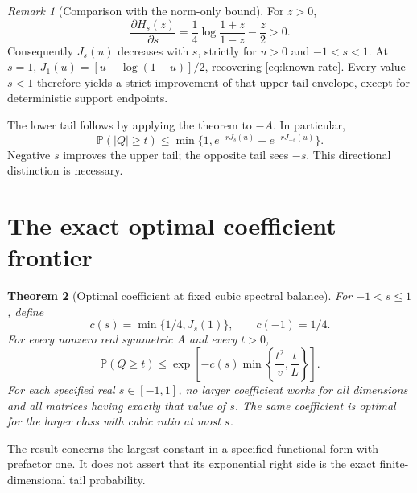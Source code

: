 \documentclass[11pt,letterpaper]{article}
\numberwithin{equation}{section}
\newtheorem{theorem}{Theorem}[section]
\theoremstyle{definition}\newtheorem{definition}[theorem]{Definition}
\theoremstyle{remark}\newtheorem{remark}[theorem]{Remark}
\newcommand{\PP}{\mathbb P}
\begin{document}
\begin{remark}[Comparison with the norm-only bound]
For $z>0$,
\[
 \frac{\partial H_s(z)}{\partial s}
 =\frac14\log\frac{1+z}{1-z}-\frac z2>0.
\]
Consequently $J_s(u)$ decreases with $s$, strictly for $u>0$ and
$-1<s<1$. At $s=1$,
$J_1(u)=[u-\log(1+u)]/2$, recovering \eqref{eq:known-rate}.
Every value $s<1$ therefore yields a strict improvement of that
upper-tail envelope, except for deterministic support endpoints.
\end{remark}

The lower tail follows by applying the theorem to $-A$. In particular,
\begin{equation}\label{eq:two-sided}
 \PP(|Q|\ge t)\le
 \min\{1,e^{-rJ_s(u)}+e^{-rJ_{-s}(u)}\}.
\end{equation}
Negative $s$ improves the upper tail; the opposite tail sees $-s$.
This directional distinction is necessary.

\section{The exact optimal coefficient frontier}\label{sec:frontier}

\begin{theorem}[Optimal coefficient at fixed cubic spectral balance]
\label{thm:frontier}
For $-1<s\le1$, define
\begin{equation}\label{eq:c}
 c(s)=\min\{1/4,J_s(1)\},\qquad c(-1)=1/4.
\end{equation}
For every nonzero real symmetric $A$ and every $t>0$,
\begin{equation}\label{eq:main}
 \boxed{\displaystyle
 \PP(Q\ge t)\le
 \exp\!\left[-c(s)\min\left\{\frac{t^2}{v},\frac tL\right\}\right].}
\end{equation}
For each specified real $s\in[-1,1]$, no larger coefficient works for
all dimensions and all matrices having \emph{exactly} that value of $s$.
The same coefficient is optimal for the larger class with cubic ratio
at most $s$.
\end{theorem}

The result concerns the largest constant in a specified functional form
with prefactor one. It does not assert that its exponential right side
is the exact finite-dimensional tail probability.
\end{document}
